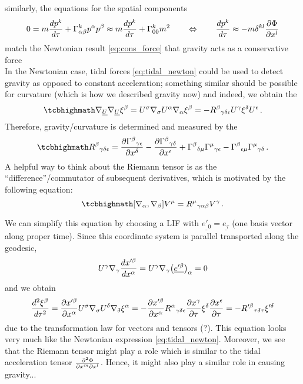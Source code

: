 similarly, the equations for the spatial components
\begin{equation}
0 = m \dv{p^k}{\tau} + \Gamma^k_{\alpha \beta} p^\alpha p^\beta \approx m \dv{p^k}{\tau} + \Gamma^k_{0 0} m^2 \qquad \Leftrightarrow \qquad \dv{p^k}{\tau} \approx - m \delta^{k l} \pdv{\Phi}{x^l}
\end{equation}
match the Newtonian result \eqref{eq:cons_force} that gravity acts as a conservative force\\


In the Newtonian case, tidal forces \eqref{eq:tidal_newton} could be used to detect gravity as opposed to constant acceleration; something similar should be possible for curvature (which is how we described gravity now) and indeed, we obtain the 
\begin{equation}\label{eq:geod_dev_eq}
\eqbox{
\nabla_{\underline{U}} \nabla_{\underline{U}} \xi^\beta = U^\sigma \nabla_\sigma U^\alpha \nabla_\alpha \xi^\beta = - R^\beta{}_{\gamma \delta \epsilon} U^\gamma \xi^\delta U^\epsilon
} \, .
\end{equation}
Therefore, gravity/curvature is determined and measured by the 
\begin{equation}
\eqbox{
R^\beta{}_{\gamma \delta \epsilon} = \pdv{\Gamma^\beta{}_{\gamma \epsilon}}{x^\delta} - \pdv{\Gamma^\beta{}_{\gamma \delta}}{x^\epsilon} + \Gamma^\beta{}_{\delta \mu} \Gamma^\mu{}_{\gamma \epsilon} - \Gamma^\beta{}_{\epsilon \mu} \Gamma^\mu{}_{\gamma \delta}
} \, .
\end{equation}
A helpful way to think about the Riemann tensor is as the \enquote{difference}/commutator of subsequent derivatives, which is motivated by the following equation:
\begin{equation}
\eqbox{
\qty[\nabla_\alpha, \nabla_\beta] V^\mu = R^\mu{}_{\gamma \alpha \beta} V^\gamma
} \, .
\end{equation}


We can simplify this equation by choosing a LIF with $\underline{e'_0} = \underline{e_\tau}$ (one basis vector along proper time). Since this coordinate system is parallel transported along the geodesic,
\begin{equation*}
U^\gamma \nabla_\gamma \dv{x'^\beta}{x^\alpha} = U^\gamma \nabla_\gamma \qty(\underline{e'^\beta})_\alpha = 0
\end{equation*}
and we obtain
\begin{equation}
\dv[2]{\xi^\beta}{\tau} = \pdv{x'^\beta}{x^\alpha} U^\sigma \nabla_\sigma U^\delta \nabla_\delta \xi^\alpha = - \pdv{x'^\beta}{x^\alpha} R^\alpha{}_{\gamma \delta \epsilon} \pdv{x^\gamma}{\tau} \xi^\delta \pdv{x^\epsilon}{\tau} = - R'^\beta{}_{\tau \delta \tau} \xi'^\delta
\end{equation}
due to the transformation law for vectors and tensors (?). This equation looks very much like the Newtonian expression \eqref{eq:tidal_newton}. Moreover, we see that the Riemann tensor might play a role which is similar to the tidal acceleration tensor $\pdv[2]{\Phi}{x^m}{x^l}$. Hence, it might also play a similar role in causing gravity...



